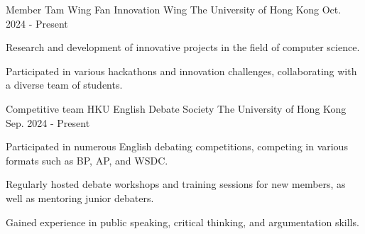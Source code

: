 

\begin{cventries}

\cventry
  {Member} %
  {Tam Wing Fan Innovation Wing} %
  {The University of Hong Kong} %
  {Oct. 2024 - Present} %
  {
    \begin{cvitems} %
      \item {Research and development of innovative projects in the field of computer science.}
      \item {Participated in various hackathons and innovation challenges, collaborating with a diverse team of students.}
    \end{cvitems}
  }

  \cventry
    {Competitive team} %
    {HKU English Debate Society} %
    {The University of Hong Kong} %
    {Sep. 2024 - Present} %
    {
      \begin{cvitems} %
        \item {Participated in numerous English debating competitions, competing in various formats such as BP, AP, and WSDC.}
        \item {Regularly hosted debate workshops and training sessions for new members, as well as mentoring junior debaters.}
        \item {Gained experience in public speaking, critical thinking, and argumentation skills.}
      \end{cvitems}
    }

\end{cventries}
